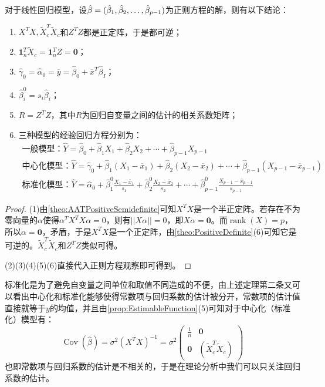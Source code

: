 \begin{theorem}\label{prop:LinearRegressionModel}
	对于线性回归模型，设$\hat{\beta}=(\hat{\beta}_1, \hat{\beta}_2, \dots, \hat{\beta}_{p-1})$为正则方程的解，则有以下结论：
	\begin{enumerate}
		\item $X^TX,\tilde{X}_c^T\tilde{X}_c$和$Z^TZ$都是正定阵，于是都可逆；
		\item $\mathbf{1}_n^T\tilde{X}_c=\mathbf{1}_n^TZ=\mathbf{0}$；
		\item $\hat{\gamma}_0=\hat{\alpha}_0=\overline{y}=\hat{\beta}_0+\overline{x}^T\hat{\beta}_I$；
		\item $\hat{\beta}_i^0=s_i\hat{\beta}_i$；
		\item $R=Z^TZ$，其中$R$为回归自变量之间的估计的相关系数矩阵；
		\item 三种模型的经验回归方程分别为：
		\begin{gather*}
			\text{一般模型：}\hat{Y}=\hat{\beta}_0+\hat{\beta}_1X_1+\hat{\beta}_2X_2+\cdots+\hat{\beta}_{p-1}X_{p-1} \\
			\text{中心化模型：}\hat{Y}=\hat{\gamma}_0+\hat{\beta}_1(X_1-\overline{x}_1)+\hat{\beta}_2(X_2-\overline{x}_2)+\cdots+\hat{\beta}_{p-1}(X_{p-1}-\overline{x}_{p-1}) \\
			\text{标准化模型：}\hat{Y}=\hat{\alpha}_0+\hat{\beta}_1^0\frac{X_1-\overline{x}_1}{s_1}+\hat{\beta}_2^0\frac{X_2-\overline{x}_2}{s_2}+\cdots+\hat{\beta}_{p-1}^0\frac{X_{p-1}-\overline{x}_{p-1}}{s_{p-1}}
		\end{gather*}
	\end{enumerate}
\end{theorem}
\begin{proof}
	(1)由\cref{theo:AATPositiveSemidefinite}可知$X^TX$是一个半正定阵。若存在不为零向量的$\alpha$使得$\alpha^TX^TX\alpha=0$，则有$||X\alpha||=0$，即$X\alpha=\mathbf{0}$。而$\operatorname{rank}(X)=p$，所以$\alpha=\mathbf{0}$，矛盾，于是$X^TX$是一个正定阵，由\cref{theo:PositiveDefinite}(6)可知它是可逆的。$\tilde{X}_c^T\tilde{X}_c$和$Z^TZ$类似可得。\par
	(2)(3)(4)(5)(6)直接代入正则方程观察即可得到。
\end{proof}
\begin{note}
	标准化是为了避免自变量之间单位和取值不同造成的不便，由上述定理第二条又可以看出中心化和标准化能够使得常数项与回归系数的估计被分开，常数项的估计值直接就等于$y$的均值，并且由\cref{prop:EstimableFunction}(5)可知对于中心化（标准化）模型有：
	\begin{equation*}
		\operatorname{Cov}(\hat{\beta})=\sigma^2(X^TX)^{-1}=\sigma^2
		\begin{pmatrix}
			\frac{1}{n} & \mathbf{0} \\
			\mathbf{0} & (\tilde{X}_c^T\tilde{X}_c)
		\end{pmatrix}
	\end{equation*}
	也即常数项与回归系数的估计是不相关的，于是在理论分析中我们可以只关注回归系数的估计。
\end{note}


